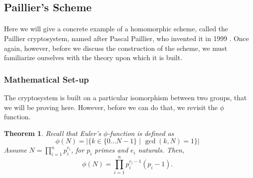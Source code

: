 \documentclass{article}
\newtheorem{theorem}{Theorem}[section]
\theoremstyle{definition}
\begin{document}
\subsection{Paillier's Scheme}
\paragraph{}
Here we will give a concrete example of a homomorphic scheme, called the Paillier
cryptosystem, named after Pascal Paillier, who invented it in 1999
\cite{paillier1999public}. Once again, however, before we discuss the
construction of the scheme, we must familiarize ourselves with the theory upon
which it is built.
\subsubsection{Mathematical Set-up}
The cryptosystem is built on a particular isomorphism between two groups, that
we will be proving here. However, before we can do that, we revisit the $\phi$
function.
\begin{theorem}
  \label{thm:phiformula}
  Recall that Euler's $\phi$-function is defined as
  \[
    \phi(N) = |\{k \in \{0\hdots N - 1\} \,\,|\,\, \gcd(k, N) = 1\}|
  \]
  Assume $N = \prod_{i = 1}^n p_i^{e_i}$, for $p_i$ primes and $e_i$ naturals. Then,
  \[
    \phi(N) = \prod_{i = 1}^n p_i^{e_i - 1} (p_i - 1).
  \]
\end{theorem}
\end{document}
